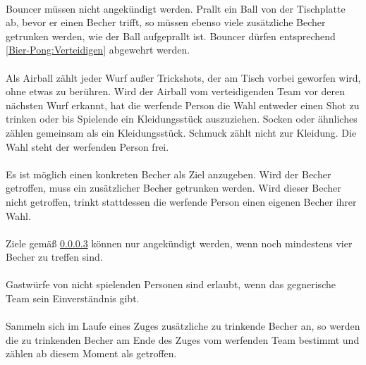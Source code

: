 \paragraph{}
\glqq Bouncer\grqq{} müssen nicht angekündigt werden.
Prallt ein Ball von der Tischplatte ab, bevor er einen Becher trifft, so müssen ebenso viele zusätzliche Becher getrunken werden, wie der Ball aufgeprallt ist.
Bouncer dürfen entsprechend \ref{Bier-Pong:Verteidigen} abgewehrt werden.

\paragraph{}
Als \glqq Airball\grqq{} zählt jeder Wurf außer Trickshots, der am Tisch vorbei geworfen wird, ohne etwas zu berühren.
Wird der Airball vom verteidigenden Team vor deren nächsten Wurf erkannt, hat die werfende Person die Wahl entweder einen Shot zu trinken oder bis Spielende ein Kleidungsstück auszuziehen.
Socken oder ähnliches zählen gemeinsam als ein Kleidungsstück.
Schmuck zählt nicht zur Kleidung.
Die Wahl steht der werfenden Person frei.

\paragraph{} \label{Bier-Pong:Werfen:Ankündigen}
Es ist möglich einen konkreten Becher als Ziel anzugeben.
Wird der Becher getroffen, muss ein zusätzlicher Becher getrunken werden.
Wird dieser Becher nicht getroffen, trinkt stattdessen die werfende Person einen eigenen Becher ihrer Wahl.

\paragraph{}
Ziele gemäß \ref{Bier-Pong:Werfen:Ankündigen} können nur angekündigt werden, wenn noch mindestens vier Becher zu treffen sind.

\paragraph{}
Gastwürfe von nicht spielenden Personen sind erlaubt, wenn das gegnerische Team sein Einverständnis gibt.

\paragraph{}
Sammeln sich im Laufe eines Zuges zusätzliche zu trinkende Becher an, so werden die zu trinkenden Becher am Ende des Zuges vom werfenden Team bestimmt und zählen ab diesem Moment als getroffen.


